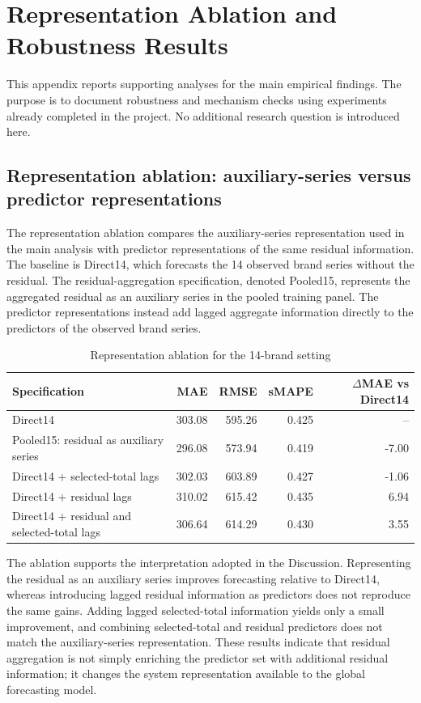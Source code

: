 \section{Representation Ablation and Robustness Results}
\label{app:robustness-results}

This appendix reports supporting analyses for the main empirical findings. The purpose is to document robustness and mechanism checks using experiments already completed in the project. No additional research question is introduced here.

\subsection{Representation ablation: auxiliary-series versus predictor representations}
\label{app:representation-ablation}

The representation ablation compares the auxiliary-series representation used in the main analysis with predictor representations of the same residual information. The baseline is Direct14, which forecasts the 14 observed brand series without the residual. The residual-aggregation specification, denoted Pooled15, represents the aggregated residual as an auxiliary series in the pooled training panel. The predictor representations instead add lagged aggregate information directly to the predictors of the observed brand series.

\begin{table}[!htbp]
\centering
\caption{Representation ablation for the 14-brand setting}
\label{tab:representation-ablation}
\begin{tabular}{lrrrr}
\hline
Specification & MAE & RMSE & sMAPE & $\Delta$MAE vs Direct14 \\
\hline
Direct14 & 303.08 & 595.26 & 0.425 & -- \\
Pooled15: residual as auxiliary series & 296.08 & 573.94 & 0.419 & -7.00 \\
Direct14 + selected-total lags & 302.03 & 603.89 & 0.427 & -1.06 \\
Direct14 + residual lags & 310.02 & 615.42 & 0.435 & 6.94 \\
Direct14 + residual and selected-total lags & 306.64 & 614.29 & 0.430 & 3.55 \\
\hline
\end{tabular}
\end{table}

The ablation supports the interpretation adopted in the Discussion. Representing the residual as an auxiliary series improves forecasting relative to Direct14, whereas introducing lagged residual information as predictors does not reproduce the same gains. Adding lagged selected-total information yields only a small improvement, and combining selected-total and residual predictors does not match the auxiliary-series representation. These results indicate that residual aggregation is not simply enriching the predictor set with additional residual information; it changes the system representation available to the global forecasting model.

